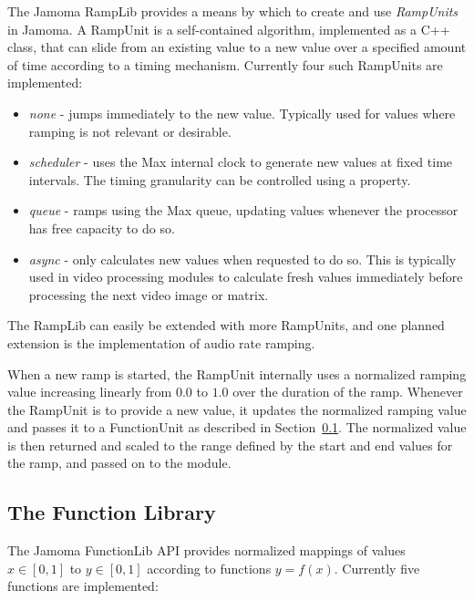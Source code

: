 \documentclass{article}
\begin{document}
The Jamoma RampLib provides a means by which to create and use \emph{RampUnits} in Jamoma.  A RampUnit is a self-contained algorithm, implemented as a C++ class, that can slide from an existing value to a new value over a specified amount of time according to a timing mechanism. Currently four such RampUnits are implemented:

\begin{itemize}
	\item \emph{none} - jumps immediately to the new value. Typically used for values where ramping is not relevant or desirable.
	\item \emph{scheduler} - uses the Max internal clock to generate new values at fixed time intervals. The timing granularity can be controlled using a property.
	\item \emph{queue} - ramps using the Max queue, updating values whenever the processor has free capacity to do so.
	\item \emph{async} - only calculates new values when requested to do so. This is typically used in video processing modules to calculate fresh values immediately before processing the next video image or matrix.
\end{itemize}

The RampLib can easily be extended with more RampUnits, and one planned extension is the implementation of audio rate ramping.

When a new ramp is started, the RampUnit internally uses a normalized ramping value increasing linearly from $0.0$ to $1.0$ over the duration of the ramp. Whenever the RampUnit is to provide a new value, it updates the normalized ramping value and passes it to a FunctionUnit as described in Section~\ref{ssec:functionlib}. The normalized value is then returned and scaled to the range defined by the start and end values for the ramp, and passed on to the module.


\subsection{The Function Library} %
\label{ssec:functionlib}

The Jamoma FunctionLib API provides normalized mappings of values $x \in [0,1]$ to $y \in [0,1]$ according to functions $y = f(x)$. Currently five functions are implemented: 
\end{document}
